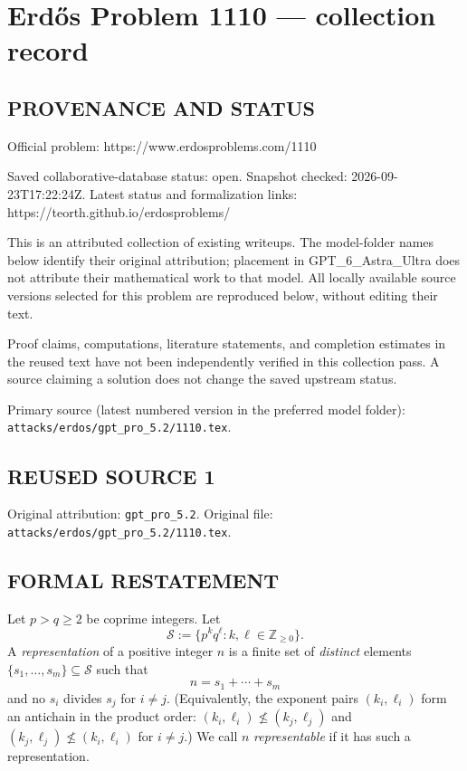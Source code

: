 \section*{Erd\H{o}s Problem 1110 --- collection record}

\subsection*{PROVENANCE AND STATUS}
Official problem: https://www.erdosproblems.com/1110

Saved collaborative-database status: open.
Snapshot checked: 2026-09-23T17:22:24Z.
Latest status and formalization links: https://teorth.github.io/erdosproblems/

This is an attributed collection of existing writeups. The model-folder names below identify their original attribution; placement in GPT\_6\_Astra\_Ultra does not attribute their mathematical work to that model. All locally available source versions selected for this problem are reproduced below, without editing their text.

Proof claims, computations, literature statements, and completion estimates in the reused text have not been independently verified in this collection pass. A source claiming a solution does not change the saved upstream status.

Primary source (latest numbered version in the preferred model folder): \texttt{attacks/erdos/gpt\_pro\_5.2/1110.tex}.

\subsection*{REUSED SOURCE 1}
Original attribution: \texttt{gpt\_pro\_5.2}.
Original file: \texttt{attacks/erdos/gpt\_pro\_5.2/1110.tex}.


\subsection*{FORMAL RESTATEMENT}
Let $p>q\ge 2$ be coprime integers.
Let
\[\mathcal{S} := \{p^k q^\ell : k,\ell\in\mathbb{Z}_{\ge 0}\}.\]
A \emph{representation} of a positive integer $n$ is a finite set of \emph{distinct} elements $\{s_1,\dots,s_m\}\subseteq\mathcal{S}$ such that
\[n=s_1+\cdots+s_m\]
and no $s_i$ divides $s_j$ for $i\ne j$.
(Equivalently, the exponent pairs $(k_i,\ell_i)$ form an antichain in the product order: $(k_i,\ell_i)\not\le (k_j,\ell_j)$ and $(k_j,\ell_j)\not\le (k_i,\ell_i)$ for $i\ne j$.)
We call $n$ \emph{representable} if it has such a representation.

